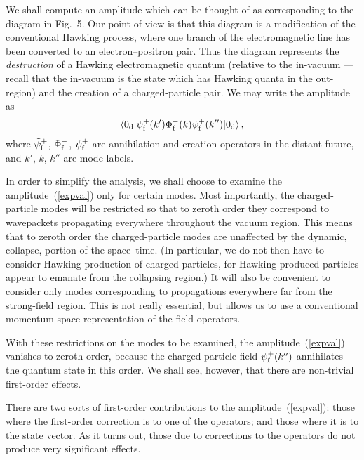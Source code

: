 \documentclass[12pt]{article}
\begin{document}
We shall compute an amplitude which can be thought of as corresponding to the
diagram in Fig.~5.  Our point of view is that this diagram is a modification of
the conventional Hawking process, where one branch of the electromagnetic line
has been converted to an electron--positron pair.  Thus the diagram represents
the {\em destruction} of a Hawking electromagnetic quantum (relative to the
in-vacuum --- recall that the in-vacuum is the state which has Hawking quanta
in the out-region) and the creation of a charged-particle pair.  We may write
the amplitude as
\begin{equation}\label{expval}
\langle 0_{\rm d}|{\tilde\psi}^+_{\rm f}(k')\Phi
^-_{\rm f}(k)\psi ^+_{\rm f}(k'')|0_{\rm d}\rangle\, ,
\end{equation}
where ${\tilde\psi}^+_{\rm f}$, $\Phi ^-_{\rm f}$, $\psi ^+_{\rm f}$ are
annihilation  and creation operators in the distant future, and $k'$, $k$,
$k''$ are mode labels.  

In order to simplify the analysis, we shall choose to examine the
amplitude~(\ref{expval}) only for certain modes.   Most importantly, the
charged-particle modes will be restricted so that to zeroth order they
correspond to wavepackets propagating everywhere throughout the vacuum region. 
This means that to zeroth order the charged-particle modes are unaffected by
the dynamic, collapse, portion of the space--time. (In particular, we do not
then have to consider Hawking-production of charged particles, for
Hawking-produced particles appear to emanate from the collapsing region.) It
will also be convenient to consider only modes corresponding to propagations
everywhere far from the strong-field region.  This is not really essential, but
allows us to use a conventional momentum-space representation of the field
operators.

With these restrictions on the modes to be examined,  the
amplitude~(\ref{expval})  vanishes to zeroth order, because the
charged-particle field $\psi ^+_{\rm f}(k'')$ annihilates the quantum state in
this order.  We shall see, however, that there are non-trivial first-order
effects.

There are two sorts of first-order contributions to the 
amplitude~(\ref{expval}):   those where the first-order correction is to one of
the operators; and those where it is to the state vector.  As it turns out,
those due to corrections to the operators do not produce very significant
effects.  
\end{document}
